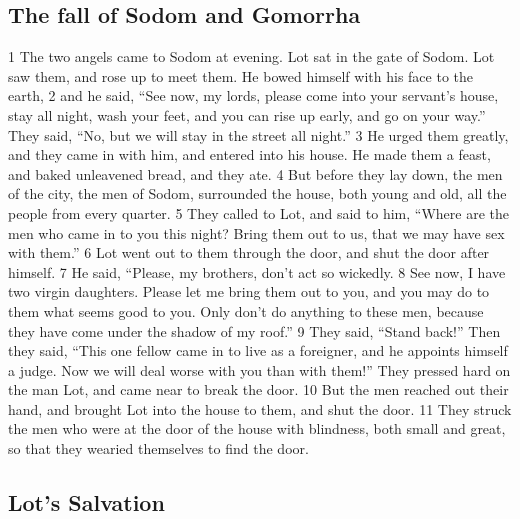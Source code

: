 \hypertarget{the-fall-of-sodom-and-gomorrha}{%
\subsection{The fall of Sodom and
Gomorrha}\label{the-fall-of-sodom-and-gomorrha}}

{1} The two angels came to Sodom at evening. Lot sat in the gate of
Sodom. Lot saw them, and rose up to meet them. He bowed himself with his
face to the earth, {2} and he said, ``See now, my lords, please come
into your servant's house, stay all night, wash your feet, and you can
rise up early, and go on your way.'' They said, ``No, but we will stay
in the street all night.'' {3} He urged them greatly, and they came in
with him, and entered into his house. He made them a feast, and baked
unleavened bread, and they ate. {4} But before they lay down, the men of
the city, the men of Sodom, surrounded the house, both young and old,
all the people from every quarter. {5} They called to Lot, and said to
him, ``Where are the men who came in to you this night? Bring them out
to us, that we may have sex with them.'' {6} Lot went out to them
through the door, and shut the door after himself. {7} He said,
``Please, my brothers, don't act so wickedly. {8} See now, I have two
virgin daughters. Please let me bring them out to you, and you may do to
them what seems good to you. Only don't do anything to these men,
because they have come under the shadow of my roof.'' {9} They said,
``Stand back!'' Then they said, ``This one fellow came in to live as a
foreigner, and he appoints himself a judge. Now we will deal worse with
you than with them!'' They pressed hard on the man Lot, and came near to
break the door. {10} But the men reached out their hand, and brought Lot
into the house to them, and shut the door. {11} They struck the men who
were at the door of the house with blindness, both small and great, so
that they wearied themselves to find the door.

\hypertarget{lots-salvation}{%
\subsection{Lot's Salvation}\label{lots-salvation}}

